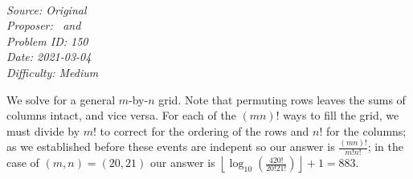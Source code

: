 \SSbreak\\
\emph{Source: Original}\\
\emph{Proposer: \Ptan\, and \Pwen}\\
\emph{Problem ID: 150}\\
\emph{Date: 2021-03-04}\\
\emph{Difficulty: Medium}\\
\SSbreak

\bigskip

\begin{solution}\hfil\medskip
  
    We solve for a general $m$-by-$n$ grid. Note that permuting rows leaves the sums of columns intact, and vice versa. For each of the $(mn)!$ 
    ways to fill the grid, we must divide by $m!$ to correct for the ordering of the rows and $n!$ for the columns; as we established before
    these events are indepent so our answer is $\frac{(mn)!}{m!n!}$; in the case of $(m, n) = (20, 21)$ our answer is 
    $\left\lfloor\log_{10}\left(\frac{420!}{20!21!}\right) \right\rfloor + 1 = \boxed{883}.$
\end{solution}\bigskip
